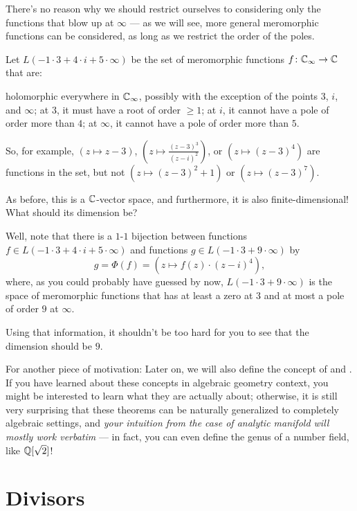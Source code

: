 \begin{example}
	There's no reason why we should restrict ourselves to considering only the functions that blow
	up at $\infty$ --- as we will see, more general meromorphic functions can be considered, as long
	as we restrict the order of the poles.

	Let $L(-1 \cdot 3 + 4 \cdot i + 5 \cdot \infty)$ be the set of meromorphic functions $f \colon
	\mathbb C_\infty \to \mathbb C$ that are:
	\begin{itemize}
		\ii holomorphic everywhere in $\mathbb C_\infty$,
		possibly with the exception of the points $3$, $i$, and $\infty$;
		\ii at $3$, it must have a root of order $\geq 1$;
		\ii at $i$, it cannot have a pole of order more than $4$;
		\ii at $\infty$, it cannot have a pole of order more than $5$.
	\end{itemize}
	So, for example, $(z \mapsto z-3)$, $(z \mapsto \frac{(z-3)^3}{(z-i)^2})$, or $(z \mapsto
	(z-3)^4)$ are functions in the set, but not $(z \mapsto (z-3)^2+1)$ or $(z \mapsto (z-3)^7)$.

	As before, this is a $\mathbb C$-vector space, and furthermore, it is also finite-dimensional!
	What should its dimension be?

	Well, note that there is a $1$-$1$ bijection between functions
	$f \in L(-1 \cdot 3 + 4 \cdot i + 5 \cdot \infty)$
	and functions $g \in L(-1 \cdot 3 + 9 \cdot \infty)$ by
	\[ g = \Phi(f) = (z \mapsto f(z) \cdot (z-i)^4), \]
	where, as you could probably have guessed by now,
	$L(-1 \cdot 3 + 9 \cdot \infty)$ is the space of meromorphic functions that
	has at least a zero at $3$ and at most a pole of order $9$ at $\infty$.

	Using that information, it shouldn't be too hard for you to see
	that the dimension should be $9$.
\end{example}

For another piece of motivation:
Later on, we will also define the concept of  and .
If you have learned about these concepts in algebraic geometry context, you might be interested to
learn what they are actually about;
otherwise,
it is still very surprising that these theorems can be naturally generalized to completely algebraic
settings, and \emph{your intuition from
the case of analytic manifold will mostly work verbatim} --- in fact, you can even define the genus
of a number field, like $\mathbb Q[\sqrt 2]$!

\section{Divisors}

